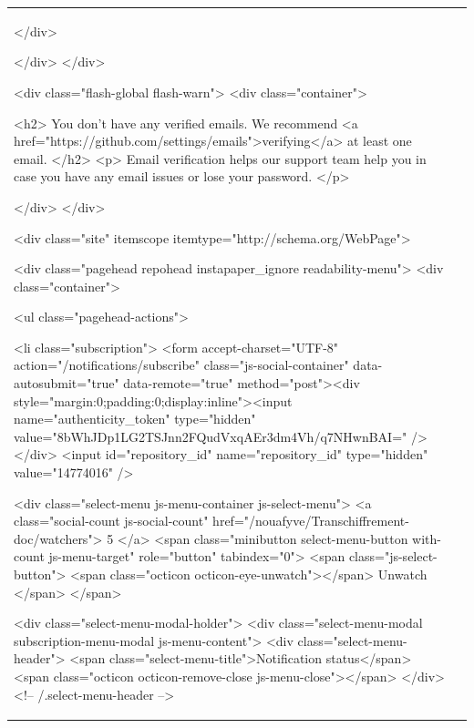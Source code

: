 \documentclass[a4paper,11pt,french]{article}
\begin{document}
\begin{tabular}{|m{8cm}|m{8cm}|}
</div>


    
  </div>
</div>

      

      

<div class="flash-global flash-warn">
<div class="container">

    <h2>
      You don't have any verified emails.  We recommend <a href="https://github.com/settings/emails">verifying</a> at least one email.
    </h2>
    <p>
      Email verification helps our support team help you in case you have any email issues or lose your password.
    </p>














</div>
</div>



          <div class="site" itemscope itemtype="http://schema.org/WebPage">
    
    <div class="pagehead repohead instapaper_ignore readability-menu">
      <div class="container">
        

<ul class="pagehead-actions">

    <li class="subscription">
      <form accept-charset="UTF-8" action="/notifications/subscribe" class="js-social-container" data-autosubmit="true" data-remote="true" method="post"><div style="margin:0;padding:0;display:inline"><input name="authenticity_token" type="hidden" value="8bWhJDp1LG2TSJnn2FQudVxqAEr3dm4Vh/q7NHwnBAI=" /></div>  <input id="repository_id" name="repository_id" type="hidden" value="14774016" />

    <div class="select-menu js-menu-container js-select-menu">
      <a class="social-count js-social-count" href="/nouafyve/Transchiffrement-doc/watchers">
        5
      </a>
      <span class="minibutton select-menu-button with-count js-menu-target" role="button" tabindex="0">
        <span class="js-select-button">
          <span class="octicon octicon-eye-unwatch"></span>
          Unwatch
        </span>
      </span>

      <div class="select-menu-modal-holder">
        <div class="select-menu-modal subscription-menu-modal js-menu-content">
          <div class="select-menu-header">
            <span class="select-menu-title">Notification status</span>
            <span class="octicon octicon-remove-close js-menu-close"></span>
          </div> <!-- /.select-menu-header -->


\end{tabular}
\end{document}
